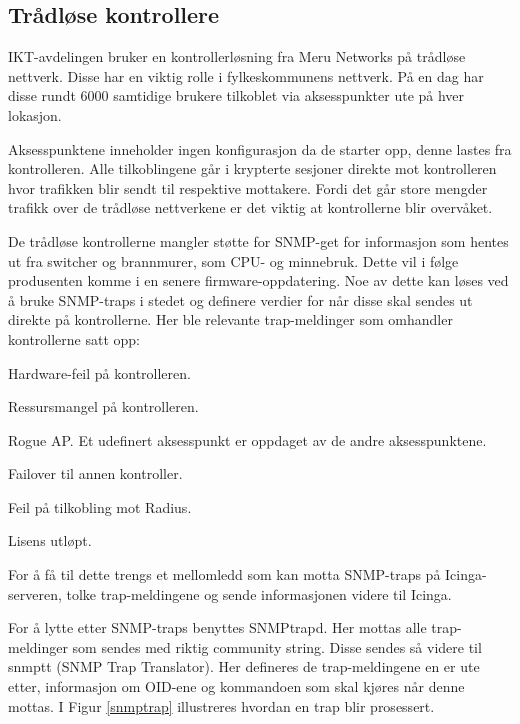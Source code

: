 \subsection{Trådløse kontrollere}
IKT-avdelingen bruker en kontrollerløsning fra Meru Networks på trådløse nettverk. Disse har en viktig rolle i fylkeskommunens nettverk. På en dag har disse rundt 6000 samtidige brukere tilkoblet via aksesspunkter ute på hver lokasjon.

Aksesspunktene inneholder ingen konfigurasjon da de starter opp, denne lastes fra kontrolleren. Alle tilkoblingene går i krypterte sesjoner direkte mot kontrolleren hvor trafikken blir sendt til respektive mottakere. Fordi det går store mengder trafikk over de trådløse nettverkene er det viktig at kontrollerne blir overvåket.

De trådløse kontrollerne mangler støtte for SNMP-get for informasjon som hentes ut fra switcher og brannmurer, som CPU- og minnebruk. Dette vil i følge produsenten komme i en senere firmware-oppdatering. Noe av dette kan løses ved å bruke SNMP-traps i stedet og definere verdier for når disse skal sendes ut direkte på kontrollerne. Her ble relevante trap-meldinger som omhandler kontrollerne satt opp:
\begin{itemize*}
	\item Hardware-feil på kontrolleren.
	\item Ressursmangel på kontrolleren.
	\item Rogue AP. Et udefinert aksesspunkt er oppdaget av de andre aksesspunktene.
	\item Failover til annen kontroller.
	\item Feil på tilkobling mot Radius.
	\item Lisens utløpt.
\end{itemize*}

For å få til dette trengs et mellomledd som kan motta SNMP-traps på Icinga-serveren, tolke trap-meldingene og sende informasjonen videre til Icinga. 

For å lytte etter SNMP-traps benyttes SNMPtrapd\cite{snmptraps2}. Her mottas alle trap-meldinger som sendes med riktig community string. Disse sendes så videre til snmptt (SNMP Trap Translator\cite{traptranselator}). Her defineres de trap-meldingene en er ute etter, informasjon om OID-ene og kommandoen som skal kjøres når denne mottas. I Figur \ref{snmptrap} illustreres hvordan en trap blir prosessert. 

